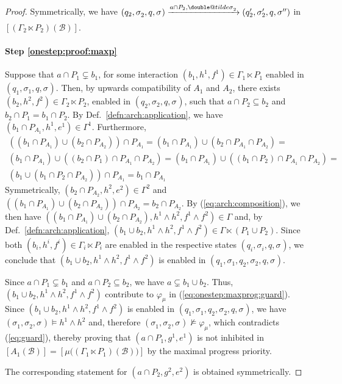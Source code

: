 \documentclass{llncs}
\makeatletter
\newcommand{\defn}[1]{Def.~\ref{defn:#1}}
\newcommand{\eq}[1]{(\ref{eq:#1})}
\newcommand{\cB}{\ensuremath{\mathcal{B}}}
\newcommand{\goesto}[2][]{\ensuremath{\xrightarrow[{#1}\relax]{#2}}}
\newcommand{\val}[3][]{\ensuremath{#1{\sigma}^{#2}_{#3}}}
\newcommand{\primeit}[1]{#1'}
\newcommand{\secondit}[1]{#1''}
\newcommand{\semopen}[1]{\ensuremath{[{#1}]}}
\newcommand{\IMextend}[2]{\ensuremath{#1 \ltimes #2}}
\newcommand{\expmix}{\wedge}
\newcommand{\doubletilde}[1]{{%
  \mathpalette\double@tilde{#1}%
}}
\newcommand{\double@tilde}[2]{%
  \sbox\z@{$\m@th#1\tilde{#2}$}%
  \ht\z@=.9\ht\z@
  \tilde{\box\z@}%
}
\makeatother
\begin{document}
\begin{proof}
  Symmetrically, we have 
  $
  (q_2, \val{}{2}, q, \val{}{})
  \goesto{a \cap P_2, \val[\doubletilde]{}{2}}
  (q_2', \val[\primeit]{}{2}, q, \val[\secondit]{}{})
  $ in $\semopen{(\IMextend{\Gamma_2}{P_2})(\cB)}$.   
   
  \paragraph*{Step \ref{onestep:proof:maxp}}
  Suppose that $a \cap P_1 \varsubsetneq b_1$, for some interaction
  $(b_1, h^1, f^1) \in \IMextend{\Gamma_1}{P_1}$ enabled in $(q_1,
  \val{}{1}, q, \val{}{})$.  Then, by upwards compatibility of $A_1$
  and $A_2$, there exists $(b_2, h^2, f^2) \in
  \IMextend{\Gamma_2}{P_2}$, enabled in $(q_2, \val{}{2}, q,
  \val{}{})$, such that $a \cap P_2 \subseteq b_2$ and $b_2 \cap P_1 =
  b_1 \cap P_2$.  By \defn{arch:application}, we have $(b_1 \cap P_{A_1},
  h^1, e^1) \in \Gamma^1$.  Furthermore,
%
  \begin{multline*}
    ((b_1 \cap P_{A_1}) \cup (b_2 \cap P_{A_2}))  \cap P_{A_1} =
    (b_1 \cap P_{A_1}) \cup (b_2 \cap P_{A_1} \cap P_{A_2}) =\\
    (b_1 \cap P_{A_1}) \cup ((b_2 \cap P_1) \cap P_{A_1} \cap P_{A_2}) =  
    (b_1 \cap P_{A_1}) \cup ((b_1 \cap P_2) \cap P_{A_1} \cap P_{A_2}) =\\
    (b_1 \cup (b_1 \cap P_2 \cap P_{A_2})) \cap P_{A_1} =
    b_1 \cap P_{A_1} 
  \end{multline*}
%
  Symmetrically, $(b_2 \cap P_{A_2}, h^2, e^2) \in \Gamma^2$ and
  $((b_1 \cap P_{A_1}) \cup (b_2 \cap P_{A_2})) \cap P_{A_2} = b_2
  \cap P_{A_2}$.  By \eq{arch:composition}, we then have $((b_1 \cap
  P_{A_1}) \cup (b_2 \cap P_{A_2}), h^1 \land h^2, f^1 \expmix f^2)
  \in \Gamma$ and, by \defn{arch:application}, $(b_1 \cup b_2, h^1 \land
  h^2, f^1 \expmix f^2) \in \IMextend{\Gamma}{(P_1 \cup P_2)}$.
%
  Since both $(b_i, h^i, f^i) \in \IMextend{\Gamma_i}{P_i}$ are
  enabled in the respective states $(q_i, \val{}{i}, q, \val{}{})$, we
  conclude that $(b_1 \cup b_2, h^1 \land h^2, f^1 \expmix f^2)$ is
  enabled in $(q_1, \val{}{1}, q_2, \val{}{2}, q, \val{}{})$.

  Since $a \cap P_1 \varsubsetneq b_1$ and $a \cap P_2 \subseteq b_2$,
  we have $a \varsubsetneq b_1 \cup b_2$.  Thus, $(b_1 \cup b_2, h^1
  \land h^2, f^1 \expmix f^2)$ contribute to $\varphi_\mu$ in
  \eq{onestep:maxprog:guard}.  Since $(b_1 \cup b_2, h^1 \land h^2,
  f^1 \expmix f^2)$ is enabled in $(q_1, \val{}{1}, q_2, \val{}{2}, q,
  \val{}{})$, we have $(\val{}{1}, \val{}{2}, \val{}{}) \models h^1
  \land h^2$ and, therefore $(\val{}{1}, \val{}{2}, \val{}{})
  \not\models \varphi_\mu$, which contradicts \eq{guard}, thereby
  proving that $(a \cap P_1, g^1, e^1)$ is not inhibited in
  $\semopen{A_1(\cB)} =
  \semopen{\mu\bigl((\IMextend{\Gamma_1}{P_1})(\cB)\bigr)}$ by the
  maximal progress priority.

  The corresponding statement for $(a \cap P_2, g^2, e^2)$ is obtained
  symmetrically.
\end{proof}
\end{document}
